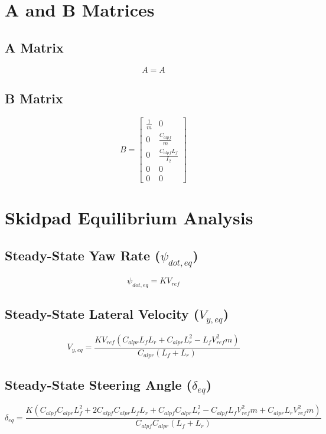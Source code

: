 \documentclass{article}
\begin{document}
\section*{A and B Matrices}
\subsection*{A Matrix}
\begin{equation}
A = A
\end{equation}
\subsection*{B Matrix}
\begin{equation}
B = \left[\begin{matrix}\frac{1}{m} & 0\\0 & \frac{C_{alp f}}{m}\\0 & \frac{C_{alp f} L_{f}}{I_{2}}\\0 & 0\\0 & 0\end{matrix}\right]
\end{equation}
\section*{Skidpad Equilibrium Analysis}
\subsection*{Steady-State Yaw Rate (\(\psi_{dot,eq}\))}
\begin{equation}
\psi_{dot,eq} = K V_{ref}
\end{equation}
\subsection*{Steady-State Lateral Velocity (\(V_{y,eq}\))}
\begin{equation}
V_{y,eq} = \frac{K V_{ref} \left(C_{alp r} L_{f} L_{r} + C_{alp r} L_{r}^{2} - L_{f} V_{ref}^{2} m\right)}{C_{alp r} \left(L_{f} + L_{r}\right)}
\end{equation}
\subsection*{Steady-State Steering Angle (\(\delta_{eq}\))}
\begin{equation}
\delta_{eq} = \frac{K \left(C_{alp f} C_{alp r} L_{f}^{2} + 2 C_{alp f} C_{alp r} L_{f} L_{r} + C_{alp f} C_{alp r} L_{r}^{2} - C_{alp f} L_{f} V_{ref}^{2} m + C_{alp r} L_{r} V_{ref}^{2} m\right)}{C_{alp f} C_{alp r} \left(L_{f} + L_{r}\right)}
\end{equation}
\end{document}
